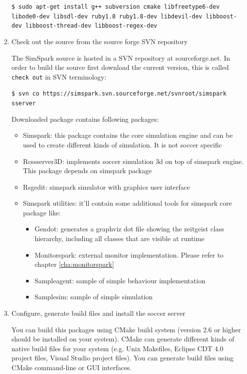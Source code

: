 \begin{enumerate}
\texttt{\$ sudo apt-get install g++ subversion cmake libfreetype6-dev libode0-dev libsdl-dev ruby1.8 ruby1.8-dev libdevil-dev libboost-dev libboost-thread-dev libboost-regex-dev}

\item Check out the source from the source forge SVN repository

The SimSpark source is hosted in a SVN repository at
sourceforge.net. In order to build the source first download the
current version, this is called \texttt{check out} in SVN terminology:

\texttt{\$ svn co https://simspark.svn.sourceforge.net/svnroot/simspark sserver}

Downloaded package contains following packages:
\begin{itemize}
\item Simspark: this package contains the core simulation engine and
can be used to create different kinds of simulation. It is not soccer
specific
\item Rcssserver3D: implements soccer simulation 3d on top of simspark
engine. This package depends on simspark package
\item Rsgedit: simspark simulator with graphics user interface
\item Simspark utilities: it'll contain some additional tools for
simspark core package like:
\begin{itemize}
\item Gendot: generates a graphviz dot file showing the zeitgeist class hierarchy, including all classes that are visible at runtime
\item Monitorspark: external monitor implementation. Please refer to chapter \ref{cha:monitorspark}
\item Sampleagent: sample of simple behaviour implementation
\item Samplesim: sample of simple simulation
\end{itemize}
\end{itemize}

\item Configure, generate build files and install the soccer server

You can build this packages using CMake build system (version 2.6 or higher
should be installed on your system). CMake can generate different kinds of
native build files for your system (e.g. Unix Makefiles, Eclipse CDT 4.0 project
files, Visual Studio project files). You can generate build files using CMake
command-line or GUI interfaces.


\end{enumerate}
